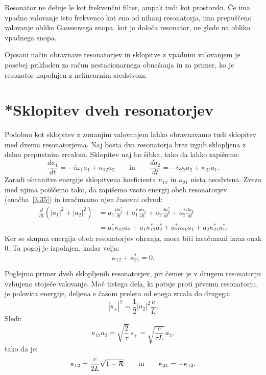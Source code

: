 Resonator ne deluje le kot frekvenčni filter, ampak tudi
kot prostorski. Če ima vpadno valovanje isto frekvenco kot
eno od nihanj resonatorja, ima prepuščeno valovanje obliko
Gaussovega snopa, kot jo določa resonator, ne glede na obliko vpadnega
snopa.

Opisani  način obravnave resonatorjev in sklopitve z vpadnim valovanjem
je posebej prikladen za račun nestacionarnega obnašanja in za primer,
ko je resonator napolnjen z nelinearnim sredstvom.

\section{*Sklopitev dveh resonatorjev}
Podobno kot sklopitev z zunanjim valovanjem lahko obravnavamo tudi
sklopitev med dvema resonatorjema. Naj bosta dva resonatorja brez izgub
sklopljena z delno prepustnim zrcalom. Sklopitev naj bo šibka, tako da lahko zapišemo:
\begin{equation}
\frac{da_1}{dt} =  -i\omega_{1}a_{1}+\kappa_{12}a_{2} \qquad \mathrm{in} \qquad 
\frac{da_2}{dt} = -i\omega_{2}a_{2}+\kappa_{21}a_{1}.
\end{equation}
Zaradi ohranitve energije sklopitvena koeficienta $\kappa_{12}$ in
$\kappa_{21}$ nista neodvisna. Zvezo med njima poiščemo tako, da zapišemo 
vsoto energij obeh resonatorjev (enačba~\ref{3.35}) in izračunamo njen časovni odvod:
\begin{align}
\frac{d}{dt}\left(|a_{1}|^{2}+|a_{2}|^{2}\right) & =  a_{1}\frac{da_1^*}{dt}+a_{1}^{*}\frac{da_1}{dt}+
a_{2}\frac{da_2^*}{dt}+a_{2}^{*}\frac{da_2}{dt}\nonumber \\
 & =  a_{1}^{*}\kappa_{12}a_{2}+a_{1}\kappa_{12}^{*}a_{2}^{*}+a_{2}^{*}\kappa_{21}a_{1}+
 a_{2}\kappa_{21}^{*}a_{1}^{*}.
\end{align}
Ker se skupna energija obeh resonatorjev ohranja, mora biti izračunani izraz enak  $0$.
Ta pogoj je izpolnjen, kadar velja:
\begin{equation}
\kappa_{12}+\kappa_{21}^{*}=0.
\label{3.56}
\end{equation}
\newpage

Poglejmo primer dveh sklopljenih resonatorjev, pri čemer je v drugem resonatorju vzbujeno 
stoječe valovanje. Moč tistega dela, ki potuje proti prvemu resonatorju,
je polovica energije, deljena s časom preleta od enega zrcala do drugega:
\begin{equation}
|s_{+}|^{2}=\frac{1}{2}|a_{2}|^{2}\frac{c}{L}.
\label{3.57}
\end{equation}
Sledi:
\begin{equation}
\kappa_{12}a_{2}=\sqrt{\frac{2}{\tau}}\, s_{+}=\sqrt{\frac{c}{\tau L}}\, a_{2},
\label{3.58}
\end{equation}
 tako da je:
\begin{equation}
\kappa_{12}=\frac{c}{2L}\sqrt{1-{\cal R}}\qquad \mathrm{in} \qquad \kappa_{21}=-\kappa_{12}.
\label{3.59}
\end{equation}

